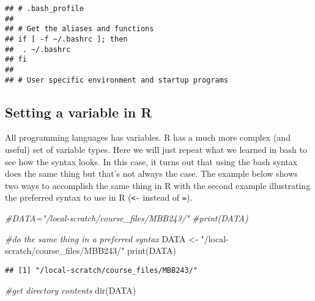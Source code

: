 \documentclass[
]{article}
\newenvironment{Shaded}{\begin{snugshade}}{\end{snugshade}}
\newcommand{\CommentTok}[1]{\textcolor[rgb]{0.56,0.35,0.01}{\textit{#1}}}
\newcommand{\FunctionTok}[1]{\textcolor[rgb]{0.00,0.00,0.00}{#1}}
\newcommand{\NormalTok}[1]{#1}
\newcommand{\OtherTok}[1]{\textcolor[rgb]{0.56,0.35,0.01}{#1}}
\newcommand{\StringTok}[1]{\textcolor[rgb]{0.31,0.60,0.02}{#1}}
\begin{document}
\begin{verbatim}
## # .bash_profile
## 
## # Get the aliases and functions
## if [ -f ~/.bashrc ]; then
##  . ~/.bashrc
## fi
## 
## # User specific environment and startup programs
\end{verbatim}

\hypertarget{setting-a-variable-in-r}{%
\subsection{Setting a variable in R}\label{setting-a-variable-in-r}}

All programming languages has variables. R has a much more complex (and
useful) set of variable types. Here we will just repeat what we learned
in bash to see how the syntax looks. In this case, it turns out that
using the bash syntax does the same thing but that's not always the
case. The example below shows two ways to accomplish the same thing in R
with the second example illustrating the preferred syntax to use in R
(\texttt{\textless{}-} instead of \texttt{=}).

\begin{Shaded}
\begin{Highlighting}[]
\CommentTok{\#DATA="/local{-}scratch/course\_files/MBB243/"}
\CommentTok{\#print(DATA)}

\CommentTok{\#do the same thing in a preferred syntax}
\NormalTok{DATA }\OtherTok{\textless{}{-}} \StringTok{"/local{-}scratch/course\_files/MBB243/"}
\FunctionTok{print}\NormalTok{(DATA)}
\end{Highlighting}
\end{Shaded}

\begin{verbatim}
## [1] "/local-scratch/course_files/MBB243/"
\end{verbatim}

\begin{Shaded}
\begin{Highlighting}[]
\CommentTok{\#get directory contents}
\FunctionTok{dir}\NormalTok{(DATA)}
\end{Highlighting}
\end{Shaded}
\end{document}
